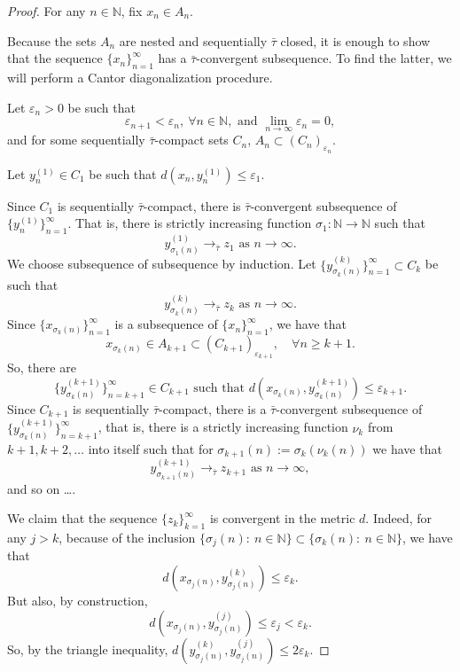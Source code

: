 \documentclass[12pt,leqno]{article}
\theoremstyle{definition}
\theoremstyle{remark}
\def\N{\mathbb{N}}
\begin{document}
\begin{proof}
    For any $n\in \N$, fix
    $
        x_n \in A_n $.

    Because the sets $A_n$ are nested and sequentially $\bar\tau$  closed, it is enough to show that the sequence $\{x_n\}_{n=1}^\infty$ has a $\bar\tau$-convergent subsequence. To find the latter, we will perform a Cantor diagonalization procedure.

    Let $\varepsilon_n > 0$ be such that
    $$
        \varepsilon_{n+1} < \varepsilon_n,\ \forall n\in\mathbb{N},\text{ and }\lim_{n\to\infty} \varepsilon_n = 0,
    $$
    and for some sequentially $\bar\tau$-compact sets $C_n$, $
        A_n \subset (C_n)_{\varepsilon_n}$.

    Let
    $
        y_n^{(1)} \in C_1$ be such that $d(x_n,y_n^{(1)}) \le \varepsilon_1$.

    Since $C_1$ is sequentially $\bar\tau$-compact, there is $\bar\tau$-convergent subsequence of $\{y_n^{(1)}\}_{n=1}^\infty$. That is, there is strictly increasing function $\sigma_1:\mathbb{N}\to\mathbb{N}$ such that
    $$
         y_{\sigma_1(n)}^{(1)} \to_{\bar\tau} z_1\text{ as } n\to \infty.
    $$
    We choose subsequence of subsequence by induction. Let $\{y_{\sigma_k(n)}^{(k)}\}_{n=1}^\infty\subset C_k$ be such that
    $$
         y_{\sigma_k(n)}^{(k)}\to_{\bar\tau} z_k \text{ as } n\to \infty.
    $$
    Since $\{x_{\sigma_k(n)}\}_{n=1}^\infty$ is a subsequence of $\{x_n\}_{n=1}^\infty$, we have that
    $$
        x_{\sigma_k(n)} \in A_{k+1} \subset (C_{k+1})_{\varepsilon_{k+1}},\quad\forall n \ge k + 1.
    $$
    So, there are
    $$
        \{y_{\sigma_k(n)}^{(k+1)}\}_{n=k+1}^\infty \in C_{k+1}\text{ such that }d(x_{\sigma_k(n)},y_{\sigma_k(n)}^{(k+1)}) \le \varepsilon_{k+1}.
    $$
    Since $C_{k+1}$ is sequentially $\bar\tau$-compact, there is a $\bar\tau$-convergent subsequence of $\{y_{\sigma_k(n)}^{(k+1)}\}_{n=k+1}^\infty$, that is, there is a strictly increasing function $\nu_k$ from $k+1,k+2,\ldots$ into itself such that for
    $
        \sigma_{k+1}(n) := \sigma_k(\nu_k(n))$
    we have that
    $$
         y_{\sigma_{k+1}(n)}^{(k+1)} \to_{\bar\tau} z_{k+1}\text{ as } n\to \infty,
    $$
    and so on \ldots.

    We claim that the sequence $\{z_k\}_{k=1}^\infty$ is  convergent in the metric $d$. Indeed, for any $j>k$, because of the inclusion $\{\sigma_j(n):\ n\in\N\} \subset \{\sigma_k(n):\ n\in\N\}$, we have that
    $$
        d(x_{\sigma_j(n)},y_{\sigma_j(n)}^{(k)}) \le \varepsilon_k.
    $$
    But also, by construction,
    $$
        d(x_{\sigma_j(n)},y_{\sigma_j(n)}^{(j)}) \le \varepsilon_j < \varepsilon_k.
    $$
    So, by the triangle inequality, $d(y_{\sigma_j(n)}^{(k)},y_{\sigma_j(n)}^{(j)}) \le 2 \varepsilon_k$.


\end{proof}
\end{document}
